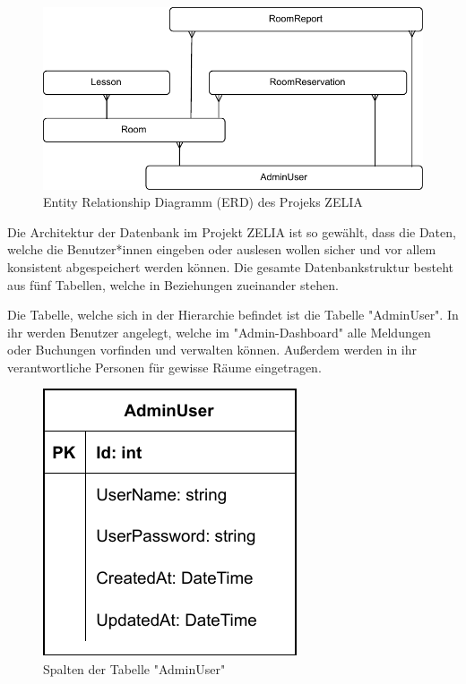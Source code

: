 
\begin{figure}[H]
    \centering
    \includegraphics{media/MariaDB/ERD.svg.pdf}
    \caption{Entity Relationship Diagramm (ERD) des Projeks ZELIA}
\end{figure}

Die Architektur der Datenbank im Projekt ZELIA ist so gewählt, dass die Daten, welche die Benutzer*innen eingeben oder auslesen wollen sicher und vor allem konsistent abgespeichert werden können. Die gesamte Datenbankstruktur besteht aus fünf Tabellen, welche in Beziehungen zueinander stehen.


Die Tabelle, welche sich in der Hierarchie befindet ist die Tabelle "AdminUser". In ihr werden Benutzer angelegt, welche im "Admin-Dashboard" alle Meldungen oder Buchungen vorfinden und verwalten können. Außerdem werden in ihr verantwortliche Personen für gewisse Räume eingetragen.

\begin{figure}[H]
    \centering
    \includegraphics{media/MariaDB/AdminUser.svg.pdf}
    \caption{Spalten der Tabelle "AdminUser"}
\end{figure}

